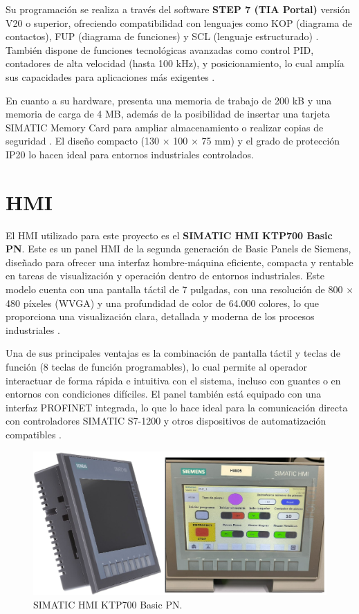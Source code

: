 Su programación se realiza a través del software \textbf{STEP 7 (TIA Portal)} versión V20 o superior, ofreciendo compatibilidad con lenguajes como KOP (diagrama de contactos), FUP (diagrama de funciones) y SCL (lenguaje estructurado) \cite{PLC_siemens}. También dispone de funciones tecnológicas avanzadas como control PID, contadores de alta velocidad (hasta 100 kHz), y posicionamiento, lo cual amplía sus capacidades para aplicaciones más exigentes \cite{PLC_siemens}.

En cuanto a su hardware, presenta una memoria de trabajo de 200 kB y una memoria de carga de 4 MB, además de la posibilidad de insertar una tarjeta SIMATIC Memory Card para ampliar almacenamiento o realizar copias de seguridad \cite{PLC_siemens}. El diseño compacto (130 × 100 × 75 mm) y el grado de protección IP20 lo hacen ideal para entornos industriales controlados.

\section{HMI}

El HMI utilizado para este proyecto es el \textbf{SIMATIC HMI KTP700 Basic PN}. Este es un panel HMI de la segunda generación de Basic Panels de Siemens, diseñado para ofrecer una interfaz hombre-máquina eficiente, compacta y rentable en tareas de visualización y operación dentro de entornos industriales. Este modelo cuenta con una pantalla táctil de 7 pulgadas, con una resolución de 800 × 480 píxeles (WVGA) y una profundidad de color de 64.000 colores, lo que proporciona una visualización clara, detallada y moderna de los procesos industriales \cite{HMI_KTP}.

Una de sus principales ventajas es la combinación de pantalla táctil y teclas de función (8 teclas de función programables), lo cual permite al operador interactuar de forma rápida e intuitiva con el sistema, incluso con guantes o en entornos con condiciones difíciles. El panel también está equipado con una interfaz PROFINET integrada, lo que lo hace ideal para la comunicación directa con controladores SIMATIC S7-1200 y otros dispositivos de automatización compatibles \cite{HMI_KTP}.

\begin{figure} [h!]
  \begin{center}
    \includegraphics[width=15cm]{figs/HMI_cap_3}
  \end{center}
  \caption{\centering SIMATIC HMI KTP700 Basic PN.}
  \label{fig:HMI_cap_3}
\end{figure} 

